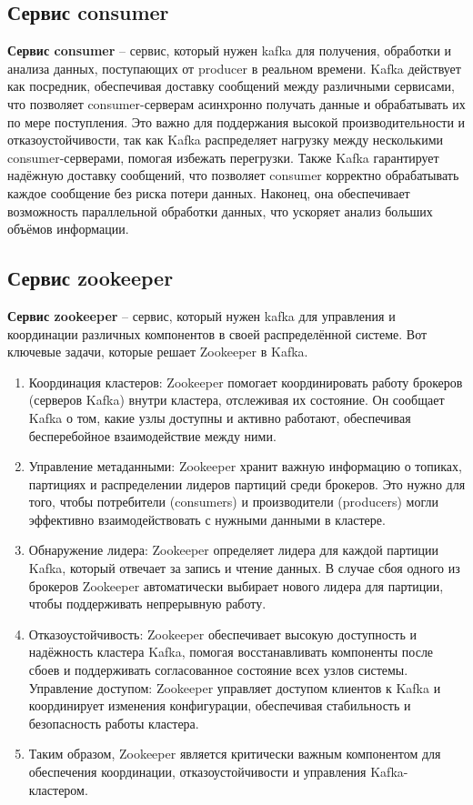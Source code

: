 \subsection{Сервис consumer}

\textbf{Сервис consumer} -- сервис, который нужен kafka для получения, обработки и анализа данных, поступающих от producer в реальном времени. Kafka действует как посредник, обеспечивая доставку сообщений между различными сервисами, что позволяет consumer-серверам асинхронно получать данные и обрабатывать их по мере поступления. Это важно для поддержания высокой производительности и отказоустойчивости, так как Kafka распределяет нагрузку между несколькими consumer-серверами, помогая избежать перегрузки. Также Kafka гарантирует надёжную доставку сообщений, что позволяет consumer корректно обрабатывать каждое сообщение без риска потери данных. Наконец, она обеспечивает возможность параллельной обработки данных, что ускоряет анализ больших объёмов информации.


\subsection{Сервис zookeeper}

\textbf{Сервис zookeeper} \cite{zookeeper} -- сервис, который нужен kafka для управления и координации различных компонентов в своей распределённой системе. Вот ключевые задачи, которые решает Zookeeper в Kafka.

\begin{enumerate}
  \item Координация кластеров: Zookeeper помогает координировать работу брокеров (серверов Kafka) внутри кластера, отслеживая их состояние. Он сообщает Kafka о том, какие узлы доступны и активно работают, обеспечивая бесперебойное взаимодействие между ними.
  \item Управление метаданными: Zookeeper хранит важную информацию о топиках, партициях и распределении лидеров партиций среди брокеров. Это нужно для того, чтобы потребители (consumers) и производители (producers) могли эффективно взаимодействовать с нужными данными в кластере.
  \item Обнаружение лидера: Zookeeper определяет лидера для каждой партиции Kafka, который отвечает за запись и чтение данных. В случае сбоя одного из брокеров Zookeeper автоматически выбирает нового лидера для партиции, чтобы поддерживать непрерывную работу.
  \item Отказоустойчивость: Zookeeper обеспечивает высокую доступность и надёжность кластера Kafka, помогая восстанавливать компоненты после сбоев и поддерживать согласованное состояние всех узлов системы.
  Управление доступом: Zookeeper управляет доступом клиентов к Kafka и координирует изменения конфигурации, обеспечивая стабильность и безопасность работы кластера.
  \item Таким образом, Zookeeper является критически важным компонентом для обеспечения координации, отказоустойчивости и управления Kafka-кластером.
\end{enumerate}


